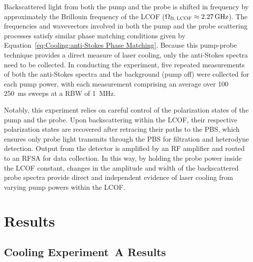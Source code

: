 Backscattered light from both the pump and the probe is shifted in frequency by approximately the Brillouin frequency of the \ac{LCOF} (\(\Omega_{\rm B,\,LCOF} \approx \SI{2.27}{\giga\hertz}\)). The frequencies and wavevectors involved in both the pump and the probe scattering processes satisfy similar phase matching conditions given by Equation~\ref{eq:Cooling:anti-Stokes Phase Matching}. Because this pump-probe technique provides a direct measure of laser cooling, only the anti-Stokes spectra need to be collected. In conducting the experiment, five repeated measurements of both the anti-Stokes spectra and the background (pump off) were collected for each pump power, with each measurement comprising an average over 100 \SI{250}{\milli\second} sweeps at a \ac{RBW} of \SI{1}{\mega\hertz}.

Notably, this experiment relies on careful control of the polarization states of the pump and the probe. Upon backscattering within the \ac{LCOF}, their respective polarization states are recovered after retracing their paths to the \ac{PBS}, which ensures only probe light transmits through the \ac{PBS} for filtration and heterodyne detection. Output from the detector is amplified by an \ac{RF} amplifier and routed to an \ac{RFSA} for data collection. In this way, by holding the probe power inside the \ac{LCOF} constant, changes in the amplitude and width of the backscattered probe spectra provide direct and independent evidence of laser cooling from varying pump powers within the \ac{LCOF}.


\section{Results}
\label{Cooling:sec:Results}


\subsection{Cooling Experiment~A Results}
\label{Cooling:subsec:ExperimentAResults}

